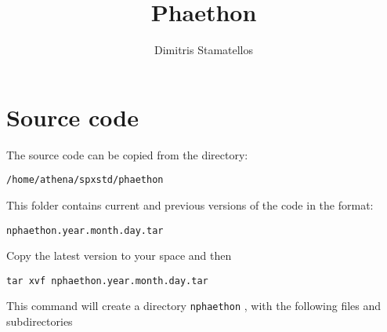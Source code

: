 \documentclass[12pt,a4paper]{article}
\begin{document}
\title{{\sc Phaethon}\\ \vspace{0.5cm}  \large{}}

\author{Dimitris Stamatellos}

\maketitle

\small
\pagebreak


\section{Source code}

The source code can be copied from the directory: 
\begin{center}
{\texttt{/home/athena/spxstd/phaethon}}
\end{center}

This folder contains current and previous versions of the code in the format:
\begin{center}
\texttt{nphaethon.year.month.day.tar}
\end{center}

Copy the latest version to your space and then

 \begin{center}
\texttt{tar xvf nphaethon.year.month.day.tar}
\end{center}

This command will create a directory \texttt{nphaethon} , with the following files and subdirectories
\end{document}

